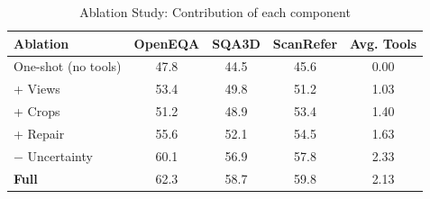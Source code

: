 \begin{table}[t]
\centering
\small
\renewcommand{\arraystretch}{1.2}
\begin{tabular}{l ccc c}
\toprule
Ablation & OpenEQA & SQA3D & ScanRefer & Avg. Tools \\
\midrule
One-shot (no tools) & 47.8 & 44.5 & 45.6 & 0.00 \\
+ Views & 53.4 & 49.8 & 51.2 & 1.03 \\
+ Crops & 51.2 & 48.9 & 53.4 & 1.40 \\
+ Repair & 55.6 & 52.1 & 54.5 & 1.63 \\
$-$ Uncertainty & 60.1 & 56.9 & 57.8 & 2.33 \\
\textbf{Full} & 62.3 & 58.7 & 59.8 & 2.13 \\
\bottomrule
\end{tabular}
\caption{Ablation Study: Contribution of each component}
\label{tab:ablation}
\end{table}